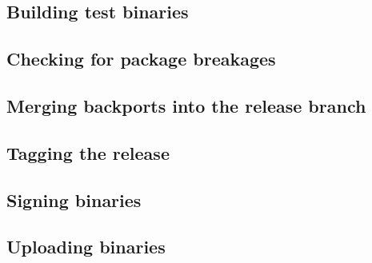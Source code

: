     \subsection{Building test binaries}
    \subsection{Checking for package breakages}
    \subsection{Merging backports into the release branch}
    \subsection{Tagging the release}
    \subsection{Signing binaries}
    \subsection{Uploading binaries}
